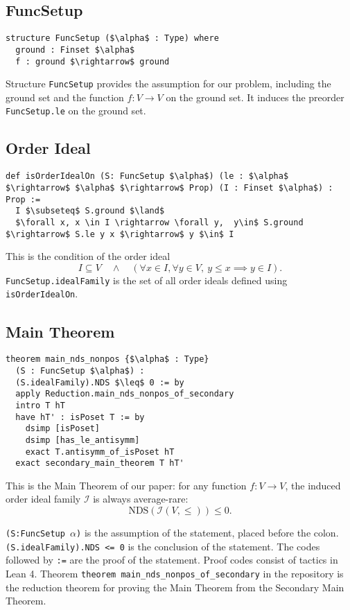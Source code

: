 \documentclass[a4paper,11pt]{article}
\begin{document}
\subsection*{FuncSetup}
\begin{lstlisting}
structure FuncSetup ($\alpha$ : Type) where
  ground : Finset $\alpha$
  f : ground $\rightarrow$ ground
\end{lstlisting}

Structure \texttt{FuncSetup} provides the assumption for our problem, including the ground set and the function $f:V \rightarrow V$ on the ground set.
It induces the preorder \texttt{FuncSetup.le} on the ground set.

\subsection*{Order Ideal}
\begin{lstlisting}
def isOrderIdealOn (S: FuncSetup $\alpha$) (le : $\alpha$ $\rightarrow$ $\alpha$ $\rightarrow$ Prop) (I : Finset $\alpha$) : Prop :=
  I $\subseteq$ S.ground $\land$
  $\forall x, x \in I \rightarrow \forall y,  y\in$ S.ground $\rightarrow$ S.le y x $\rightarrow$ y $\in$ I
\end{lstlisting}
This is the condition of the order ideal
\[
I \subseteq V \quad \wedge \quad (\forall x \in I, \forall y \in V,\ y \leq x \implies y \in I).
\]
\texttt{FuncSetup.idealFamily} is the set of all order ideals defined using \texttt{isOrderIdealOn}.


\subsection*{Main Theorem}
\begin{lstlisting}
theorem main_nds_nonpos {$\alpha$ : Type} 
  (S : FuncSetup $\alpha$) :
  (S.idealFamily).NDS $\leq$ 0 := by
  apply Reduction.main_nds_nonpos_of_secondary
  intro T hT
  have hT' : isPoset T := by
    dsimp [isPoset]
    dsimp [has_le_antisymm]
    exact T.antisymm_of_isPoset hT
  exact secondary_main_theorem T hT'
\end{lstlisting}
This is the Main Theorem of our paper: for any function \(f:V\rightarrow V\), the induced order ideal family $\mathcal{I}$ is always average-rare:
\[
{\mathrm{NDS}(\mathcal{I}(V, \le)) \le 0}.
\]

\texttt{(S:FuncSetup $\alpha$)} is the assumption of the statement, placed before the colon. 
\texttt{(S.idealFamily).NDS <= 0} is the conclusion of the statement.
The codes followed by \texttt{:=} are the proof of the statement. Proof codes consist of tactics in Lean 4.
Theorem \verb+theorem main_nds_nonpos_of_secondary+ in the repository is the reduction theorem for proving the Main Theorem from the Secondary Main Theorem.
\end{document}
